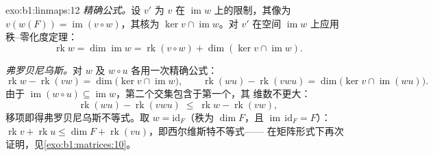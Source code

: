 \begin{solution}{exo:b1:linmaps:12}
\emph{精确公式。}设 $v'$ 为 $v$ 在
 $\operatorname{im} w$ 上的限制，其像为 $v(w(F)) =
\operatorname{im}(v \circ w)$，其核为 $\ker v \cap
\operatorname{im} w$。对 $v'$ 在空间
$\operatorname{im} w$ 上应用秩--零化度定理：
\[
\operatorname{rk} w = \dim\operatorname{im} w
= \operatorname{rk}(v \circ w) + \dim(\ker v \cap
\operatorname{im} w) .
\]

\emph{弗罗贝尼乌斯。}对 $w$ 及
$w \circ u$ 各用一次精确公式：
\[
\operatorname{rk} w - \operatorname{rk}(vw)
= \dim\bigl(\ker v \cap \operatorname{im} w\bigr),
\qquad
\operatorname{rk}(wu) - \operatorname{rk}(vwu)
= \dim\bigl(\ker v \cap \operatorname{im}(wu)\bigr) .
\]
由于 $\operatorname{im}(w \circ u) \subseteq \operatorname{im}
w$，第二个交集包含于第一个，其
维数不更大：
\[
\operatorname{rk}(wu) - \operatorname{rk}(vwu)
\;\leq\; \operatorname{rk} w - \operatorname{rk}(vw) ,
\]
移项即得弗罗贝尼乌斯不等式。取 $w =
\mathrm{id}_F$（秩为 $\dim F$，且 $\operatorname{im}\,
\mathrm{id}_F = F$）：$\operatorname{rk} v + \operatorname{rk} u
\leq \dim F + \operatorname{rk}(vu)$，即西尔维斯特不等式——
在矩阵形式下再次证明，见\cref{exo:b1:matrices:10}。
\end{solution}

